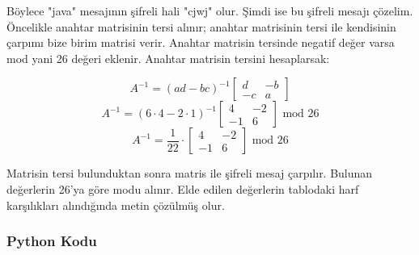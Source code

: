 Böylece "java" mesajının şifreli hali "cjwj" olur. Şimdi ise bu şifreli mesajı çözelim. Öncelikle anahtar matrisinin tersi alınır; anahtar matrisinin tersi ile kendisinin çarpımı bize birim matrisi verir. Anahtar matrisin tersinde negatif değer varsa mod yani 26 değeri eklenir. Anahtar matrisin tersini hesaplarsak:

\[ A^{-1} = (ad - bc)^{-1} \begin{bmatrix} d & -b \\ -c & a \end{bmatrix} \]
\[ A^{-1} = (6 \cdot 4 - 2 \cdot 1)^{-1} \begin{bmatrix} 4 & -2 \\ -1 & 6 \end{bmatrix} \text{ mod } 26 \]
\[ A^{-1} = \frac{1}{22} \cdot \begin{bmatrix} 4 & -2 \\ -1 & 6 \end{bmatrix} \text{ mod } 26 \]

Matrisin tersi bulunduktan sonra matris ile şifreli mesaj çarpılır. Bulunan değerlerin 26'ya göre modu alınır. Elde edilen değerlerin tablodaki harf karşılıkları alındığında metin çözülmüş olur.

\subsubsection{Python Kodu}

